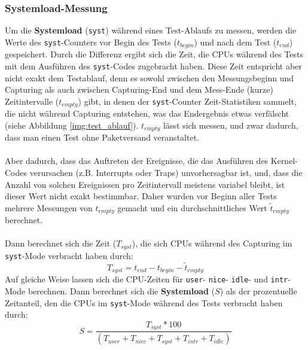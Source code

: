 \subsubsection*{Systemload-Messung}
Um die \textbf{Systemload} (\verb+syst+) während eines Test-Ablaufs zu messen, werden
die Werte des \verb+syst+-Counters vor Begin des Tests
(\begin{math}t_{begin}\end{math}) und nach dem Test (\begin{math}t_{end}\end{math}) 
gespeichert.  Durch die Differenz ergibt sich 
die Zeit, die CPUs während des Tests mit dem Ausführen des \verb+syst+-Codes zugebracht haben.  Diese Zeit entspricht aber nicht
exakt dem Testablauf, denn es sowohl zwischen den Messungsbeginn und Capturing
als auch zwischen Capturing-End und dem Mess-Ende (kurze)
Zeitintervalle (\begin{math}t_{empty}\end{math}) gibt, in
denen der \verb+syst+-Counter Zeit-Statistiken sammelt, die nicht während
Capturing entstehen, was das Endergebnis etwas verfälscht (siehe Abbildung \ref{img:test_ablauf}). \begin{math}t_{empty}\end{math} lässt sich messen, 
und zwar dadurch, dass man einen Test ohne Paketversand veranstaltet.\\\\
%
Aber dadurch, dass das Auftreten der Ereignisse, die das Ausführen des
Kernel-Codes verursachen (z.B. Interrupts oder Traps) unvorhersagbar ist, und,
dass die Anzahl von solchen Ereignissen pro Zeitintervall meistens variabel
bleibt, ist dieser Wert nicht exakt bestimmbar. Daher wurden vor Beginn aller Tests mehrere Messungen von 
\begin{math}t_{empty}\end{math} gemacht und ein durchschnittliches Wert 
\begin{math}\tilde{t}_{empty}\end{math}  berechnet.\\\\
%
Dann berechnet sich die Zeit (\begin{math}T_{syst}\end{math}), 
die sich CPUs während des Capturing im 
\verb+syst+-Mode verbracht haben durch: 
\begin{equation}
	T_{syst} = t_{end} - t_{begin} - \tilde{t}_{empty}
\end{equation}
Auf gleiche Weise lassen sich die CPU-Zeiten für \verb+user+- \verb+nice+- \verb+idle+- und \verb+intr+-Mode
berechnen. Dann berechnet sich die \textbf{Systemload} ($S$) als der prozentuelle Zeitanteil,
den die CPUs im \verb+syst+-Mode während des Tests verbracht haben 
durch:
\begin{equation}
	S = \frac{T_{syst} * 100}{(T_{user} + T_{nice} + T_{syst} + T_{intr} + T_{idle})}
\end{equation}

